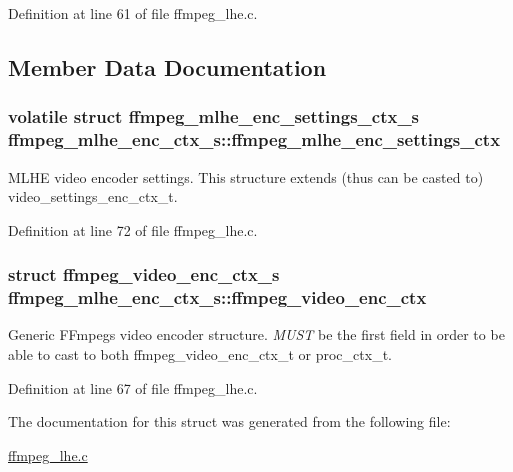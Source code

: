 Definition at line 61 of file ffmpeg\+\_\+lhe.\+c.



\subsection{Member Data Documentation}
\subsubsection[{\texorpdfstring{ffmpeg\+\_\+mlhe\+\_\+enc\+\_\+settings\+\_\+ctx}{ffmpeg_mlhe_enc_settings_ctx}}]{\setlength{\rightskip}{0pt plus 5cm}volatile struct {\bf ffmpeg\+\_\+mlhe\+\_\+enc\+\_\+settings\+\_\+ctx\+\_\+s} ffmpeg\+\_\+mlhe\+\_\+enc\+\_\+ctx\+\_\+s\+::ffmpeg\+\_\+mlhe\+\_\+enc\+\_\+settings\+\_\+ctx}\hypertarget{structffmpeg__mlhe__enc__ctx__s_aa3fe9ce12475adac61b8d05b0f03e743}{}\label{structffmpeg__mlhe__enc__ctx__s_aa3fe9ce12475adac61b8d05b0f03e743}
M\+L\+HE video encoder settings. This structure extends (thus can be casted to) video\+\_\+settings\+\_\+enc\+\_\+ctx\+\_\+t. 

Definition at line 72 of file ffmpeg\+\_\+lhe.\+c.

\subsubsection[{\texorpdfstring{ffmpeg\+\_\+video\+\_\+enc\+\_\+ctx}{ffmpeg_video_enc_ctx}}]{\setlength{\rightskip}{0pt plus 5cm}struct {\bf ffmpeg\+\_\+video\+\_\+enc\+\_\+ctx\+\_\+s} ffmpeg\+\_\+mlhe\+\_\+enc\+\_\+ctx\+\_\+s\+::ffmpeg\+\_\+video\+\_\+enc\+\_\+ctx}\hypertarget{structffmpeg__mlhe__enc__ctx__s_adce7c38297d2c5b099ef78994f06e389}{}\label{structffmpeg__mlhe__enc__ctx__s_adce7c38297d2c5b099ef78994f06e389}
Generic F\+Fmpeg\textquotesingle{}s video encoder structure. {\itshape M\+U\+ST} be the first field in order to be able to cast to both ffmpeg\+\_\+video\+\_\+enc\+\_\+ctx\+\_\+t or proc\+\_\+ctx\+\_\+t. 

Definition at line 67 of file ffmpeg\+\_\+lhe.\+c.



The documentation for this struct was generated from the following file\+:\begin{DoxyCompactItemize}
\item 
\hyperlink{ffmpeg__lhe_8c}{ffmpeg\+\_\+lhe.\+c}\end{DoxyCompactItemize}
